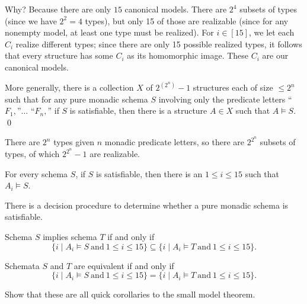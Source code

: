 \begin{aside}
    Why? Because there are only $15$ canonical models. There are $2^4$ subsets of types (since we have $2^2 = 4$ types), but only 15 of those are realizable (since for any nonempty model, at least one type must be realized). For $i \in [15]$, we let each $C_i$ realize different types; since there are only 15 possible realized types, it follows that every structure has some $C_i$ as its homomorphic image. These $C_i$ are our canonical models. 
\end{aside}

More generally, there is a collection $X$ of $2^{(2^n)}-1$ structures each of size $\leq 2^n$
such that for any pure monadic schema $S$ involving only the predicate letters
``$F_1,$''$\ldots$ ``$F_n,$'' if $S$ is satisfiable, then there is a structure $A \in X$
such that $A \models S.$ \qed

\begin{aside}
    There are $2^n$ types given $n$ monadic predicate letters, so there are $2^{2^n}$ subsets of types, of which $2^{2^n} - 1$ are realizable.  
\end{aside}

\begin{corollary}
For every schema $S$, if $S$ is satisfiable, then there is an $1\leq i\leq 15$ such that $A_i\models S$. 
\end{corollary}

\begin{corollary}
There is a decision procedure to determine whether a pure
monadic schema is satisfiable.
\end{corollary}


\begin{corollary}\label{monad-cor}
\begin{item}
\item\label{imp-item}
Schema $S$ implies schema $T$  if and only if 
\[\{i\mid A_i\models S\ \mbox{and}\ 1\leq i\leq 15\}\subseteq\{i\mid A_i\models T\ \mbox{and}\ 1\leq i\leq 15\}.\]
\item\label{equiv-item}
Schemata $S$ and $T$ are equivalent if and only if 
\[\{i\mid A_i\models S\ \mbox{and}\ 1\leq i\leq 15\}=\{i\mid A_i\models T\ \mbox{and}\ 1\leq i\leq 15\}.\]
\end{item}

\begin{aside}
    Show that these are all quick corollaries to the small model theorem. 
\end{aside}
\end{corollary}

